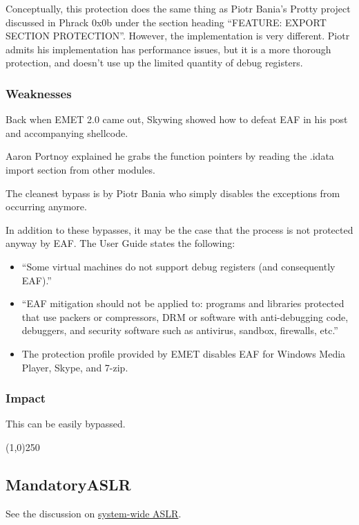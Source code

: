 \documentclass[]{article}
\newcommand{\sectionbreakline}[0]{\begin{center}\line(1,0){250}\end{center}}
\begin{document}
Conceptually, this protection does the same thing as Piotr Bania's Protty project discussed in Phrack 0x0b\cite{protty} under the section heading ``FEATURE: EXPORT SECTION PROTECTION''.  However, the implementation is very different.  Piotr admits his implementation has performance issues, but it is a more thorough protection, and doesn't use up the limited quantity of debug registers.

\subsubsection{Weaknesses}
Back when EMET 2.0 came out, Skywing showed how to defeat EAF in his post\cite{eaf_bypass} and accompanying shellcode\cite{eaf_bypass_shellcode}.

Aaron Portnoy explained he grabs the function pointers by reading the .idata import section from other modules\cite{bypass_all_the_things}.

The cleanest bypass is by Piotr Bania who simply disables the exceptions from occurring anymore\cite{bania_eaf}.

In addition to these bypasses, it may be the case that the process is not protected anyway by EAF.  The User Guide states the following:
\begin{itemize}
\item ``Some virtual machines do not support debug registers (and consequently EAF).''
\item ``EAF mitigation should not be applied to: programs and libraries protected that use packers or compressors, DRM or software with anti-debugging code, debuggers, and security software such as antivirus, sandbox, firewalls, etc.''
\item The protection profile provided by EMET disables EAF for Windows Media Player, Skype, and 7-zip.
\end{itemize}

\subsubsection{Impact}
This can be easily bypassed.

\sectionbreakline{}








\subsection{MandatoryASLR}\label{mandatoryaslr}
See the discussion on \hyperref[system_aslr]{system-wide ASLR}.
\end{document}
